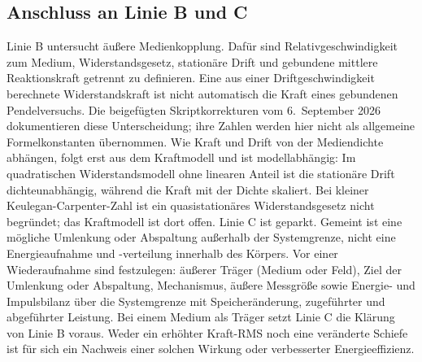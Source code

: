 \documentclass[11pt,a4paper]{article}
\begin{document}
\subsection{Anschluss an Linie B und C}
Linie B untersucht äußere Medienkopplung. Dafür sind Relativgeschwindigkeit zum Medium, Widerstandsgesetz, stationäre Drift und gebundene mittlere Reaktionskraft getrennt zu definieren. Eine aus einer Driftgeschwindigkeit berechnete Widerstandskraft ist nicht automatisch die Kraft eines gebundenen Pendelversuchs. Die beigefügten Skriptkorrekturen vom 6.~September 2026 dokumentieren diese Unterscheidung; ihre Zahlen werden hier nicht als allgemeine Formelkonstanten übernommen.
Wie Kraft und Drift von der Mediendichte abhängen, folgt erst aus dem Kraftmodell und ist modellabhängig: Im quadratischen Widerstandsmodell ohne linearen Anteil ist die stationäre Drift dichteunabhängig, während die Kraft mit der Dichte skaliert. Bei kleiner Keulegan-Carpenter-Zahl ist ein quasistationäres Widerstandsgesetz nicht begründet; das Kraftmodell ist dort offen.
Linie C ist geparkt. Gemeint ist eine mögliche Umlenkung oder Abspaltung außerhalb der Systemgrenze, nicht eine Energieaufnahme und -verteilung innerhalb des Körpers. Vor einer Wiederaufnahme sind festzulegen: äußerer Träger (Medium oder Feld), Ziel der Umlenkung oder Abspaltung, Mechanismus, äußere Messgröße sowie Energie- und Impulsbilanz über die Systemgrenze mit Speicheränderung, zugeführter und abgeführter Leistung. Bei einem Medium als Träger setzt Linie C die Klärung von Linie B voraus. Weder ein erhöhter Kraft-RMS noch eine veränderte Schiefe ist für sich ein Nachweis einer solchen Wirkung oder verbesserter Energieeffizienz.
\end{document}
